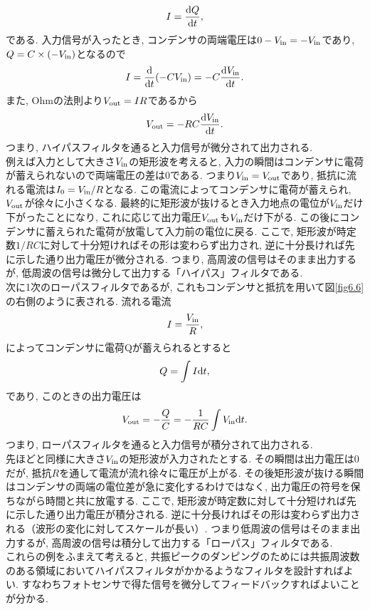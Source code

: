 \begin{equation}
I=\frac{{\rm d}Q}{{\rm d}t},
\end{equation}
である. 入力信号が入ったとき, コンデンサの両端電圧は$0-V_{\rm in}=-V_{\rm in}$であり, $Q=C\times(-V_{\rm in})$となるので
\begin{equation}
I=\frac{{\rm d}}{{\rm d}t}(-CV_{\rm in})=-C\frac{{\rm d}V_{\rm in}}{{\rm d}t}.
\end{equation}
また, Ohmの法則より$V_{\rm out}=IR$であるから
\begin{equation}
V_{\rm out}=-RC\frac{{\rm d}V_{\rm in}}{{\rm d}t}.
\end{equation}
つまり, ハイパスフィルタを通ると入力信号が微分されて出力される. \\
\quad 例えば入力として大きさ$V_{\rm in}$の矩形波を考えると, 入力の瞬間はコンデンサに電荷が蓄えられないので両端電圧の差は0である. つまり$V_{\rm in}=V_{\rm out}$であり, 抵抗に流れる電流は$I_0=V_{\rm in}/R$となる. この電流によってコンデンサに電荷が蓄えられ, $V_{\rm out}$が徐々に小さくなる. 最終的に矩形波が抜けるとき入力地点の電位が$V_{\rm in}$だけ下がったことになり, これに応じて出力電圧$V_{\rm out}$も$V_{\rm in}$だけ下がる. この後にコンデンサに蓄えられた電荷が放電して入力前の電位に戻る. ここで, 矩形波が時定数$1/RC$に対して十分短ければその形は変わらず出力され, 逆に十分長ければ先に示した通り出力電圧が微分される. つまり, 高周波の信号はそのまま出力するが, 低周波の信号は微分して出力する「ハイパス」フィルタである. \\
\quad 次に1次のローパスフィルタであるが, これもコンデンサと抵抗を用いて図\ref{fig6.6}の右側のように表される. 流れる電流
\begin{equation}
I=\frac{V_{\rm in}}{R},
\end{equation}
によってコンデンサに電荷Qが蓄えられるとすると
\begin{equation}
Q=\int I{\rm d}t,
\end{equation}
であり, このときの出力電圧は
\begin{equation}
V_{\rm out}=-\frac{Q}{C}=-\frac{1}{RC}\int V_{\rm in}{\rm d}t.
\end{equation}
つまり, ローパスフィルタを通ると入力信号が積分されて出力される. \\
\quad 先ほどと同様に大きさ$V_{\rm in}$の矩形波が入力されたとする. その瞬間は出力電圧は0だが, 抵抗$R$を通して電流が流れ徐々に電圧が上がる. その後矩形波が抜ける瞬間はコンデンサの両端の電位差が急に変化するわけではなく, 出力電圧の符号を保ちながら時間と共に放電する. ここで, 矩形波が時定数に対して十分短ければ先に示した通り出力電圧が積分される. 逆に十分長ければその形は変わらず出力される（波形の変化に対してスケールが長い）. つまり低周波の信号はそのまま出力するが, 高周波の信号は積分して出力する「ローパス」フィルタである. \\
\quad これらの例をふまえて考えると, 共振ピークのダンピングのためには共振周波数のある領域においてハイパスフィルタがかかるようなフィルタを設計すればよい. すなわちフォトセンサで得た信号を微分してフィードバックすればよいことが分かる. 
